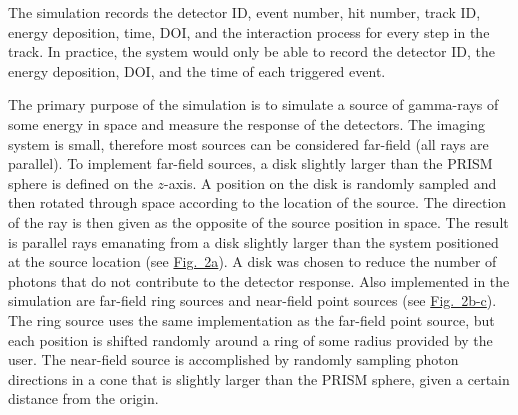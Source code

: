 \documentclass[10pt]{article}
\begin{document}
%

The simulation records the detector ID, event number, hit number, track ID, energy deposition, time, DOI, and the interaction process for every step in the track. In practice, the system would only be able to record the detector ID, the energy deposition, DOI, and the time of each triggered event. 

The primary purpose of the simulation is to simulate a source of gamma-rays of some energy in space and measure the response of the detectors. The imaging system is small, therefore most sources can be considered far-field (all rays are parallel). To implement far-field sources, a disk slightly larger than the PRISM sphere is defined on the $z$-axis. A position on the disk is randomly sampled and then rotated through space according to the location of the source. The direction of the ray is then given as the opposite of the source position in space. The result is parallel rays emanating from a disk slightly larger than the system positioned at the source location (see \hyperlink{fig2}{Fig.~2a}). A disk was chosen to reduce the number of photons that do not contribute to the detector response. Also implemented in the simulation are far-field ring sources and near-field point sources (see \hyperlink{fig2}{Fig.~2b-c}). The ring source uses the same implementation as the far-field point source, but each position is shifted randomly around a ring of some radius provided by the user. The near-field source is accomplished by randomly sampling photon directions in a cone that is slightly larger than the PRISM sphere, given a certain distance from the origin.
\end{document}
